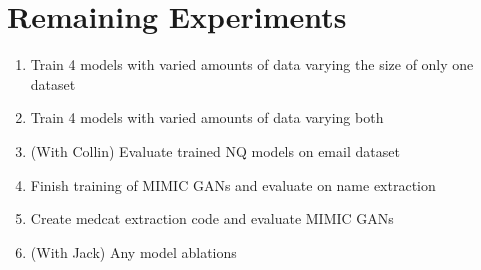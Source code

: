 \documentclass{article}
\begin{document}
\section{Remaining Experiments}
\begin{enumerate}
    \item Train 4 models with varied amounts of data varying the size of only one dataset
    \item Train 4 models with varied amounts of data varying both
    \item (With Collin) Evaluate trained NQ models on email dataset
    \item Finish training of MIMIC GANs and evaluate on name extraction
    \item Create medcat extraction code and evaluate MIMIC GANs
    \item (With Jack) Any model ablations
\end{enumerate}
\newpage



{
    \footnotesize
    \setlength{\bibsep}{0pt plus 0.1ex} 
    
    
}
\end{document}
